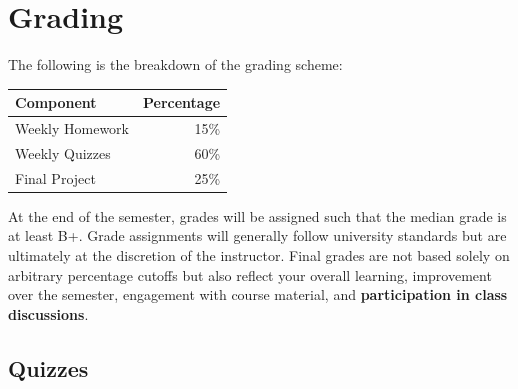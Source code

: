 \documentclass{article}
\newcommand{\sectionbreak}{\newpage}
\newcommand{\grade}[1]{\textbf{#1}}
\begin{document}
\sectionbreak
\section{Grading}

The following is the breakdown of the grading scheme:

\begin{center}
    \begin{tabular}{@{}lr@{}}
        \toprule
        \textbf{Component} & \textbf{Percentage} \\
        \midrule
        Weekly Homework & 15\% \\
        Weekly Quizzes & 60\% \\
        Final Project & 25\% \\
        \bottomrule
    \end{tabular}
\end{center}



At the end of the semester, grades will be assigned such that the median grade is at least B+. Grade assignments will generally follow university standards but are ultimately at the discretion of the instructor. Final grades are not based solely on arbitrary percentage cutoffs but also reflect your overall learning, improvement over the semester, engagement with course material, and {\bf participation in class discussions}.
\subsection{Quizzes}
\end{document}
